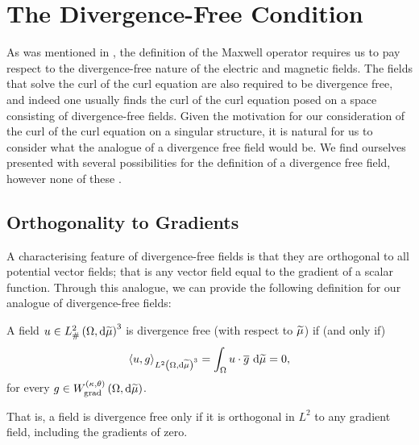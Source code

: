 \section{The Divergence-Free Condition} \label{sec:DivFreeCondition}

As was mentioned in , the definition of the Maxwell operator requires us to pay respect to the divergence-free nature of the electric and magnetic fields.
The fields that solve the curl of the curl equation are also required to be divergence free, and indeed one usually finds the curl of the curl equation posed on a space consisting of divergence-free fields.
Given the motivation for our consideration of the curl of the curl equation on a singular structure, it is natural for us to consider what the analogue of a divergence free field would be.
We find ourselves presented with several possibilities for the definition of a divergence free field, however none of these .

\subsection{Orthogonality to Gradients} \label{ssec:DivFree-OrthToAllGradients}
A characterising feature of divergence-free fields is that they are orthogonal to all potential vector fields; that is any vector field equal to the gradient of a scalar function.
Through this analogue, we can provide the following definition for our analogue of divergence-free fields:
\begin{definition} \label{def:DivFree-AllGradients}
	A field $u\in L^2_{\#}\left( \Omega,\mathrm{d} \widetilde{\mu} \right)^3$ is divergence free (with respect to $\widetilde{\mu}$) if (and only if)
	\begin{align*}
		\left\langle u , g \right\rangle_{L^{2}\left( \Omega,\mathrm{d} \widetilde{\mu} \right)^3} = \int_{\Omega} u\cdot\overline{g}  \ \mathrm{d}\widetilde{\mu} = 0,
	\end{align*}
	for every $g\in W_{\mathrm{grad}}^{\left( \kappa, \theta \right)}\left( \Omega,\mathrm{d}\widetilde{\mu} \right)$.
\end{definition}
That is, a field is divergence free only if it is orthogonal in $L^2$ to any gradient field, including the gradients of zero.

